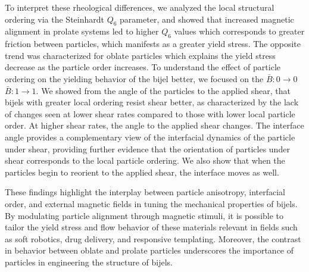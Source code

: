 To interpret these rheological differences, we analyzed the local structural ordering via the Steinhardt $Q_6$ parameter, and showed that increased magnetic alignment in 
prolate systems led to higher $Q_6$ values which corresponds to greater friction between particles, which manifests as a greater yield stress. The opposite trend was
characterized for oblate particles which explains the yield stress decrease as the particle order increases. To understand the effect of particle ordering 
on the yielding behavior of the bijel better, we focused on the $\bar{B}:0 \rightarrow 0$ $\bar{B}:1 \rightarrow 1$. We showed from the angle of the particles to the applied
shear, that bijels with greater local ordering resist shear better, as characterized by the lack of changes seen at lower shear rates compared to those with lower local
particle order. At higher shear rates, the angle to the applied shear changes. The interface angle provides a complementary view of the interfacial dynamics of the particle 
under shear, providing further evidence that the orientation of particles under shear corresponds to the local particle ordering. We also show that when the particles begin
to reorient to the applied shear, the interface moves as well. 

These findings highlight the interplay between particle anisotropy, interfacial order, and external magnetic fields in tuning the mechanical properties of bijels. 
By modulating particle alignment through magnetic stimuli, it is possible to tailor the yield stress and flow behavior of these materials relevant in fields such as soft 
robotics, drug delivery, and responsive templating. Moreover, the contrast in behavior between oblate and prolate particles 
underscores the importance of particles in engineering the structure of bijels.